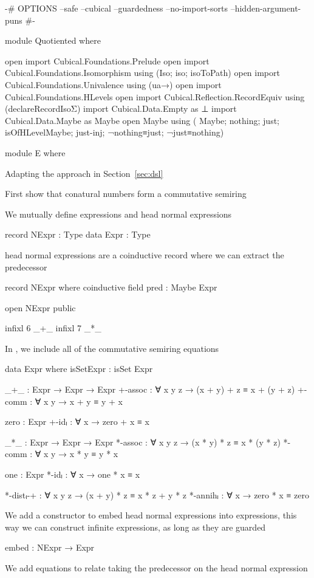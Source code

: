 \begin{code}[hide]
{-# OPTIONS
  --safe
  --cubical
  --guardedness
  --no-import-sorts
  --hidden-argument-puns #-}

module Quotiented where

open import Cubical.Foundations.Prelude
open import Cubical.Foundations.Isomorphism using (Iso; iso; isoToPath)
open import Cubical.Foundations.Univalence using (ua→)
open import Cubical.Foundations.HLevels
open import Cubical.Reflection.RecordEquiv using (declareRecordIsoΣ)
import Cubical.Data.Empty as ⊥
import Cubical.Data.Maybe as Maybe
open Maybe
  using
    ( Maybe; nothing; just;
      isOfHLevelMaybe; just-inj; ¬nothing≡just; ¬just≡nothing)

module E where
\end{code}
Adapting the approach in Section~\ref{sec:dsl}

First show that conatural numbers form a commutative semiring

We mutually define expressions and head normal expressions
\begin{code}
  record NExpr : Type
  data Expr : Type
\end{code}
head normal expressions are a coinductive record where we can extract the
predecessor
\begin{code}
  record NExpr where
    coinductive
    field pred : Maybe Expr
\end{code}
\begin{code}[hide]
  open NExpr public

  infixl 6 _+_
  infixl 7 _*_
\end{code}
In , we include all of the commutative semiring equations
\begin{code}
  data Expr where
    isSetExpr : isSet Expr

    _+_ : Expr → Expr → Expr
    +-assoc : ∀ x y z → (x + y) + z ≡ x + (y + z)
    +-comm : ∀ x y → x + y ≡ y + x

    zero : Expr
    +-idₗ : ∀ x → zero + x ≡ x

    _*_ : Expr → Expr → Expr
    *-assoc : ∀ x y z → (x * y) * z ≡ x * (y * z)
    *-comm : ∀ x y → x * y ≡ y * x

    one : Expr
    *-idₗ : ∀ x → one * x ≡ x

    *-distₗ-+ : ∀ x y z → (x + y) * z ≡ x * z + y * z
    *-annihₗ : ∀ x → zero * x ≡ zero
\end{code}
We add a constructor to embed head normal expressions into expressions, this way
we can construct infinite expressions, as long as they are guarded
\begin{code}
    embed : NExpr → Expr
\end{code}
We add equations to relate taking the predecessor on the head normal expression

